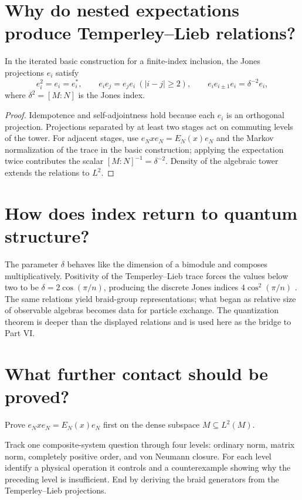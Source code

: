 \section{Why do nested expectations produce Temperley--Lieb relations?}

\begin{theorem}
In the iterated basic construction for a finite-index inclusion, the Jones
projections $e_i$ satisfy
\[
e_i^2=e_i=e_i^*,\qquad e_ie_j=e_je_i\ (|i-j|\ge2),
\qquad e_ie_{i\pm1}e_i=\delta^{-2}e_i,
\]
where $\delta^2=[M:N]$ is the Jones index.
\end{theorem}

\begin{proof}
Idempotence and self-adjointness hold because each $e_i$ is an orthogonal
projection.  Projections separated by at least two stages act on commuting
levels of the tower.  For adjacent stages, use
$e_Nxe_N=E_N(x)e_N$ and the Markov normalization of the trace in the basic
construction; applying the expectation twice contributes the scalar
$[M:N]^{-1}=\delta^{-2}$.  Density of the algebraic tower extends the
relations to $L^2$.
\end{proof}

\section{How does index return to quantum structure?}

The parameter $\delta$ behaves like the dimension of a bimodule and composes
multiplicatively.  Positivity of the Temperley--Lieb trace forces the values
below two to be $\delta=2\cos(\pi/n)$, producing the discrete Jones indices
$4\cos^2(\pi/n)$ \cite{jones-index}.  The same relations yield braid-group representations;
what began as relative size of observable algebras becomes data for particle
exchange.  The quantization theorem is deeper than the displayed relations
and is used here as the bridge to Part VI.

\section{What further contact should be proved?}

\begin{exercise}
Prove $e_Nxe_N=E_N(x)e_N$ first on the dense subspace $M\subseteq L^2(M)$.
\end{exercise}

\begin{exercise}
Track one composite-system question through four levels: ordinary norm,
matrix norm, completely positive order, and von Neumann closure.  For each
level identify a physical operation it controls and a counterexample showing
why the preceding level is insufficient.  End by deriving the braid
generators from the Temperley--Lieb projections.
\end{exercise}

